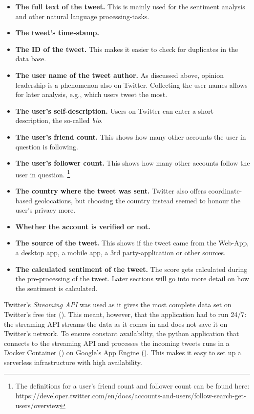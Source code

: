 \begin{itemize}
\item \textbf{The full text of the tweet.} This is mainly used for the sentiment analysis and other natural language processing-tasks.
\item \textbf{The tweet's time-stamp.}
\item \textbf{The ID of the tweet.} This makes it easier to check for duplicates in the data base. 
\item \textbf{The user name of the tweet author.} As discussed above, opinion leadership is a phenomenon also on Twitter. Collecting the user names allows for later analysis, e.g., which users tweet the most.
\item \textbf{The user's self-description.} Users on Twitter can enter a short description, the so-called \emph{bio}.
\item \textbf{The user's friend count.} This shows how many other accounts the user in question is following.
\item \textbf{The user's follower count.} This shows how many other accounts follow the user in question. \footnote{The definitions for a user's friend count and follower count can be found here: https://developer.twitter.com/en/docs/accounts-and-users/follow-search-get-users/overview}
\item \textbf{The country where the tweet was sent.} Twitter also offers coordinate-based geolocations, but choosing the country instead seemed to honour the user's privacy more.
\item \textbf{Whether the account is verified or not.}
\item \textbf{The source of the tweet.} This shows if the tweet came from the Web-App, a desktop app, a mobile app, a 3rd party-application or other sources.
\item \textbf{The calculated sentiment of the tweet.} The score gets calculated during the pre-processing of the tweet. Later sections will go into more detail on how the sentiment is calculated.
\end{itemize}


Twitter's \emph{Streaming API} was used as it gives the most complete data set on Twitter's free tier (\cite{bruns_twitter_2014}). This meant, however, that the application had to run 24/7: the streaming API streams the data as it comes in and does not save it on Twitter's network. To ensure constant availability, the python application that connects to the streaming API and processes the incoming tweets runs in a Docker Container (\cite{merkel2014docker}) on Google's App Engine (\cite{google_app_2020}). This makes it easy to set up a serverless infrastructure with high availability.

